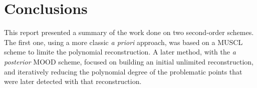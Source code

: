 \section{Conclusions}
\label{sec:900}

This report presented a summary of the work done on two second-order schemes. The first one, using a more classic \textit{a priori} approach, was based on a MUSCL scheme to limite the polynomial reconstruction. A later method, with the \textit{a posterior} MOOD scheme, focused on building an initial unlimited reconstruction, and iteratively reducing the polynomial degree of the problematic points that were later detected with that reconstruction.

